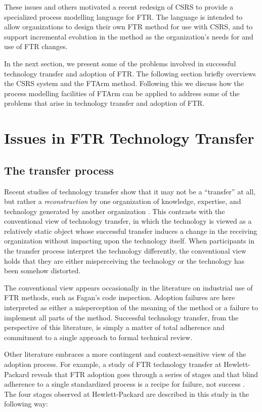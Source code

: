 These issues and others motivated a recent redesign of CSRS to provide a
specialized process modelling language for FTR.  The language is intended
to allow organizations to design their own FTR method for use with CSRS, and
to support incremental evolution in the method as the organization's
needs for and use of FTR changes.

In the next section, we present some of the problems involved in successful
technology transfer and adoption of FTR.  The following section briefly
overviews the CSRS system and the FTArm method.  Following this we discuss
how the process modelling facilities of FTArm can be applied to address
some of the problems that arise in technology transfer and adoption of FTR.


\section{Issues in FTR Technology Transfer}

\subsection{The transfer process}

Recent studies of technology transfer show that it may not be a
``transfer'' at all, but rather a {\em reconstruction} by one organization
of knowledge, expertise, and technology generated by another
organization \cite{Doheny-Farina92}.  This contrasts with the conventional view of
technology transfer, in which the technology is viewed as a relatively
static object whose successful transfer induces a change in the receiving
organization without impacting upon the technology itself.  When
participants in the transfer process interpret the technology differently,
the conventional view holds that they are either misperceiving the
technology or the technology has been somehow distorted.

The conventional view appears occasionally in the literature on industrial
use of FTR methods, such as Fagan's code inspection. Adoption failures are
here interpreted as either a misperception of the meaning of the method or
a failure to implement all parts of the method.  Successful technology
transfer, from the perspective of this literature, is simply a matter of
total adherence and commitment to a single approach to formal technical
review.

Other literature embraces a more contingent and context-sensitive view of
the adoption process.  For example, a study of FTR technology transfer at
Hewlett-Packard reveals that FTR adoption goes through a series of stages
and that blind adherence to a single standardized process is a recipe for
failure, not success \cite{Grady94}.  The four stages observed at Hewlett-Packard are
described in this study in the following way:

